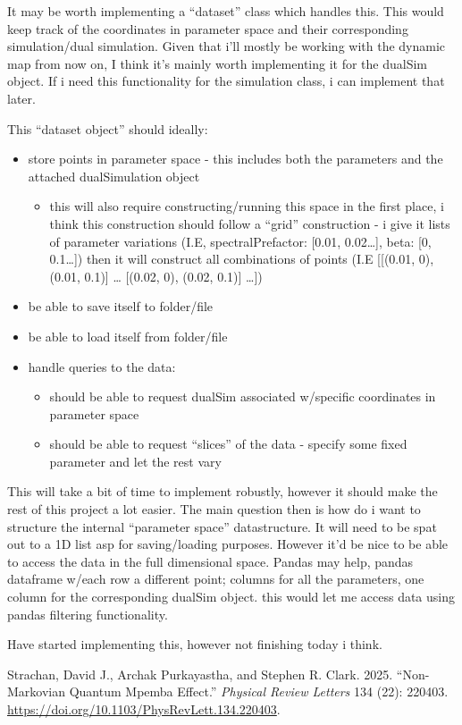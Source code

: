 \documentclass[
  letterpaper,
  DIV=11,
  numbers=noendperiod]{scrartcl}
\newlength{\cslhangindent}
\newenvironment{CSLReferences}[2] %
 {\begin{list}{}{%
  \setlength{\itemindent}{0pt}
  \setlength{\leftmargin}{0pt}
  \setlength{\parsep}{0pt}
  \ifodd #1
   \setlength{\leftmargin}{\cslhangindent}
   \setlength{\itemindent}{-1\cslhangindent}
  \fi
  \setlength{\itemsep}{#2\baselineskip}}}
 {\end{list}}
\providecommand{\tightlist}{%
  \setlength{\itemsep}{0pt}\setlength{\parskip}{0pt}}
\begin{document}
It may be worth implementing a ``dataset'' class which handles this.
This would keep track of the coordinates in parameter space and their
corresponding simulation/dual simulation. Given that i'll mostly be
working with the dynamic map from now on, I think it's mainly worth
implementing it for the dualSim object. If i need this functionality for
the simulation class, i can implement that later.

This ``dataset object'' should ideally:

\begin{itemize}
\tightlist
\item
  store points in parameter space - this includes both the parameters
  and the attached dualSimulation object

  \begin{itemize}
  \tightlist
  \item
    this will also require constructing/running this space in the first
    place, i think this construction should follow a ``grid''
    construction - i give it lists of parameter variations (I.E,
    spectralPrefactor: {[}0.01, 0.02\ldots{]}, beta: {[}0, 0.1\ldots{]})
    then it will construct all combinations of points (I.E {[}{[}(0.01,
    0), (0.01, 0.1){]} \ldots{} {[}(0.02, 0), (0.02, 0.1){]} \ldots{]})
  \end{itemize}
\item
  be able to save itself to folder/file
\item
  be able to load itself from folder/file
\item
  handle queries to the data:

  \begin{itemize}
  \tightlist
  \item
    should be able to request dualSim associated w/specific coordinates
    in parameter space
  \item
    should be able to request ``slices'' of the data - specify some
    fixed parameter and let the rest vary
  \end{itemize}
\end{itemize}

This will take a bit of time to implement robustly, however it should
make the rest of this project a lot easier. The main question then is
how do i want to structure the internal ``parameter space''
datastructure. It will need to be spat out to a 1D list asp for
saving/loading purposes. However it'd be nice to be able to access the
data in the full dimensional space. Pandas may help, pandas dataframe
w/each row a different point; columns for all the parameters, one column
for the corresponding dualSim object. this would let me access data
using pandas filtering functionality.

Have started implementing this, however not finishing today i think.

\label{refs}
\begin{CSLReferences}{1}{0}
Strachan, David J., Archak Purkayastha, and Stephen R. Clark. 2025.
{``Non-{Markovian} {Quantum} {Mpemba} {Effect}.''} \emph{Physical Review
Letters} 134 (22): 220403.
\url{https://doi.org/10.1103/PhysRevLett.134.220403}.

\end{CSLReferences}
\end{document}
